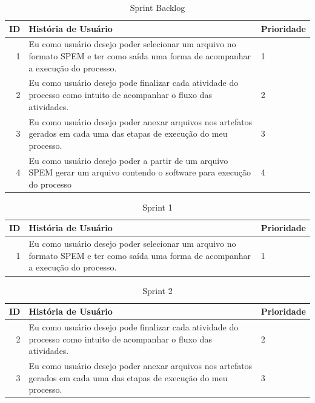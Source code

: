 \begin{table}[!htb]
	\centering
	\caption{Sprint Backlog}
		\label{sprintbacklog}
	\vspace{0.5cm}
	\begin{tabular}{r|p{11cm}|p{2cm}}
		
		ID & História de Usuário & Prioridade \\ %
		\hline                               %
		1 & Eu como usuário desejo poder selecionar um arquivo no formato SPEM e ter como saída uma forma de acompanhar a execução do processo.        & 1 \\
				\hline 
		2 & Eu como usuário desejo pode finalizar cada atividade do processo como intuito de acompanhar o fluxo das atividades.  & 2 \\
				\hline 
		3 & Eu como usuário desejo poder anexar arquivos nos artefatos gerados em cada uma das etapas de execução do meu processo.           & 3 \\
				\hline 
		4 & Eu como usuário desejo poder a partir de um arquivo SPEM gerar um arquivo contendo o software para execução do processo        & 4 \\         %
		
	\end{tabular}
\end{table}

\begin{table}[!htb]

	\centering
	\caption{Sprint 1}
		\label{sprint1}
	\vspace{0.5cm}
	\begin{tabular}{r|p{11cm}|p{2cm}}
		ID & História de Usuário & Prioridade \\ %
		\hline                               %
		1 & Eu como usuário desejo poder selecionar um arquivo no formato SPEM e ter como saída uma forma de acompanhar a execução do processo.        & 1 
		
	\end{tabular}
\end{table}

\begin{table}[!htb]

	\centering
	\caption{Sprint 2}
		\label{sprint2}
	\vspace{0.5cm}
	\begin{tabular}{r|p{11cm}|p{2cm}}
		
		ID & História de Usuário & Prioridade \\ %
		\hline     
		2 & Eu como usuário desejo pode finalizar cada atividade do processo como intuito de acompanhar o fluxo das atividades.  & 2 \\
		\hline 
		3 & Eu como usuário desejo poder anexar arquivos nos artefatos gerados em cada uma das etapas de execução do meu processo.           & 3 
	\end{tabular}
\end{table}

